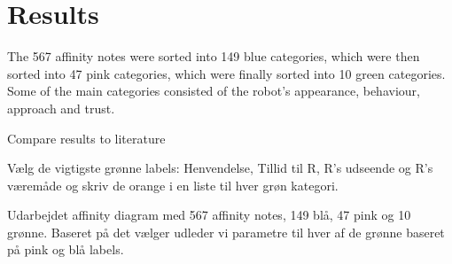 \section{Results}
\label{Results}

The 567 affinity notes were sorted into 149 blue categories, which were then sorted into 47 pink categories, which were finally sorted into 10 green categories. Some of the main categories consisted of the robot’s appearance, behaviour, approach and trust.

Compare results to literature


Vælg de vigtigste grønne labels: Henvendelse, Tillid til R, R's udseende og R's væremåde og skriv de orange i en liste til hver grøn kategori. 

Udarbejdet affinity diagram med 567 affinity notes, 149 blå, 47 pink og 10 grønne. Baseret på det vælger udleder vi parametre til hver af de grønne baseret på pink og blå labels. 